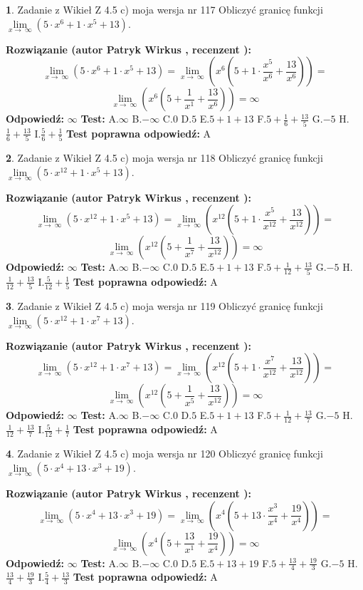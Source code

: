 \documentclass[12pt, a4paper]{article}
\theoremstyle{definition} %
\newtheorem{zad}{}
\newcommand{\zadStart}[1]{\begin{zad}#1\newline}
\newcommand{\zadStop}{\end{zad}}
\newcommand{\rozwStart}[2]{\noindent \textbf{Rozwiązanie (autor #1 , recenzent #2): }\newline}
\newcommand{\rozwStop}{\newline}
\newcommand{\odpStart}{\noindent \textbf{Odpowiedź:}\newline}
\newcommand{\odpStop}{\newline}
\newcommand{\testStart}{\noindent \textbf{Test:}\newline}
\newcommand{\testStop}{\newline}
\newcommand{\kluczStart}{\noindent \textbf{Test poprawna odpowiedź:}\newline}
\newcommand{\kluczStop}{\newline}
\begin{document}
\zadStart{Zadanie z Wikieł Z 4.5 c) moja wersja nr 117}
Obliczyć granicę funkcji  $\lim\limits_{x\to\ \infty}(5 \cdot x^{6}+1 \cdot x^{5}+13)$.
\zadStop
\rozwStart{Patryk Wirkus}{}
$$\lim\limits_{x\to\ \infty}(5 \cdot x^{6}+1 \cdot x^{5}+13) = \lim\limits_{x\to\ \infty}(x^{6}(5 +1 \cdot \frac{x^{5}}{x^{6}}+\frac{13}{x^{6}})) =$$ $$\lim\limits_{x\to\ \infty}(x^{6}(5 +\frac{1}{x^{1}}+\frac{13}{x^{6}})) =\infty$$
\rozwStop
\odpStart
$\infty$
\odpStop
\testStart
A.$\infty$ B.$-\infty$ C.$0$ D.$5$ E.$5 + 1 + 13$
F.$5+\frac{1}{6}+\frac{13}{5}$ G.$-5$
H.$\frac{1}{6}+\frac{13}{5}$
I.$\frac{5}{6}+\frac{1}{5}$
\testStop
\kluczStart
A
\kluczStop



\zadStart{Zadanie z Wikieł Z 4.5 c) moja wersja nr 118}
Obliczyć granicę funkcji  $\lim\limits_{x\to\ \infty}(5 \cdot x^{12}+1 \cdot x^{5}+13)$.
\zadStop
\rozwStart{Patryk Wirkus}{}
$$\lim\limits_{x\to\ \infty}(5 \cdot x^{12}+1 \cdot x^{5}+13) = \lim\limits_{x\to\ \infty}(x^{12}(5 +1 \cdot \frac{x^{5}}{x^{12}}+\frac{13}{x^{12}})) =$$ $$\lim\limits_{x\to\ \infty}(x^{12}(5 +\frac{1}{x^{7}}+\frac{13}{x^{12}})) =\infty$$
\rozwStop
\odpStart
$\infty$
\odpStop
\testStart
A.$\infty$ B.$-\infty$ C.$0$ D.$5$ E.$5 + 1 + 13$
F.$5+\frac{1}{12}+\frac{13}{5}$ G.$-5$
H.$\frac{1}{12}+\frac{13}{5}$
I.$\frac{5}{12}+\frac{1}{5}$
\testStop
\kluczStart
A
\kluczStop



\zadStart{Zadanie z Wikieł Z 4.5 c) moja wersja nr 119}
Obliczyć granicę funkcji  $\lim\limits_{x\to\ \infty}(5 \cdot x^{12}+1 \cdot x^{7}+13)$.
\zadStop
\rozwStart{Patryk Wirkus}{}
$$\lim\limits_{x\to\ \infty}(5 \cdot x^{12}+1 \cdot x^{7}+13) = \lim\limits_{x\to\ \infty}(x^{12}(5 +1 \cdot \frac{x^{7}}{x^{12}}+\frac{13}{x^{12}})) =$$ $$\lim\limits_{x\to\ \infty}(x^{12}(5 +\frac{1}{x^{5}}+\frac{13}{x^{12}})) =\infty$$
\rozwStop
\odpStart
$\infty$
\odpStop
\testStart
A.$\infty$ B.$-\infty$ C.$0$ D.$5$ E.$5 + 1 + 13$
F.$5+\frac{1}{12}+\frac{13}{7}$ G.$-5$
H.$\frac{1}{12}+\frac{13}{7}$
I.$\frac{5}{12}+\frac{1}{7}$
\testStop
\kluczStart
A
\kluczStop



\zadStart{Zadanie z Wikieł Z 4.5 c) moja wersja nr 120}
Obliczyć granicę funkcji  $\lim\limits_{x\to\ \infty}(5 \cdot x^{4}+13 \cdot x^{3}+19)$.
\zadStop
\rozwStart{Patryk Wirkus}{}
$$\lim\limits_{x\to\ \infty}(5 \cdot x^{4}+13 \cdot x^{3}+19) = \lim\limits_{x\to\ \infty}(x^{4}(5 +13 \cdot \frac{x^{3}}{x^{4}}+\frac{19}{x^{4}})) =$$ $$\lim\limits_{x\to\ \infty}(x^{4}(5 +\frac{13}{x^{1}}+\frac{19}{x^{4}})) =\infty$$
\rozwStop
\odpStart
$\infty$
\odpStop
\testStart
A.$\infty$ B.$-\infty$ C.$0$ D.$5$ E.$5 + 13 + 19$
F.$5+\frac{13}{4}+\frac{19}{3}$ G.$-5$
H.$\frac{13}{4}+\frac{19}{3}$
I.$\frac{5}{4}+\frac{13}{3}$
\testStop
\kluczStart
A
\kluczStop
\end{document}
